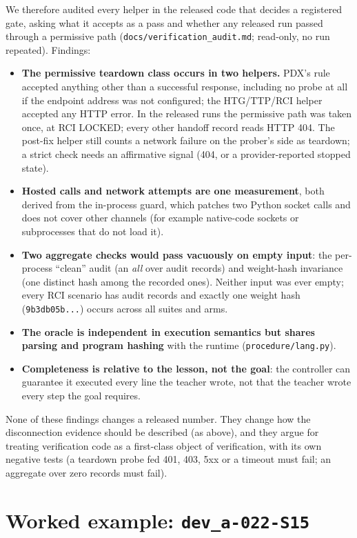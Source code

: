 \documentclass[10pt]{article}
\newcommand{\id}[1]{\nolinkurl{#1}}
\begin{document}
We therefore audited every helper in the released code that decides a registered gate, asking what it accepts as a pass and whether any released run passed through a permissive path (\id{docs/verification_audit.md}; read-only, no run repeated). Findings:
\begin{itemize}
\item \textbf{The permissive teardown class occurs in two helpers.} PDX's rule accepted anything other than a successful response, including no probe at all if the endpoint address was not configured; the HTG/TTP/RCI helper accepted any HTTP error. In the released runs the permissive path was taken once, at RCI LOCKED; every other handoff record reads HTTP 404. The post-fix helper still counts a network failure on the prober's side as teardown; a strict check needs an affirmative signal (404, or a provider-reported stopped state).
\item \textbf{Hosted calls and network attempts are one measurement}, both derived from the in-process guard, which patches two Python socket calls and does not cover other channels (for example native-code sockets or subprocesses that do not load it).
\item \textbf{Two aggregate checks would pass vacuously on empty input}: the per-process ``clean'' audit (an \emph{all} over audit records) and weight-hash invariance (one distinct hash among the recorded ones). Neither input was ever empty; every RCI scenario has audit records and exactly one weight hash (\id{9b3db05b...}) occurs across all suites and arms.
\item \textbf{The oracle is independent in execution semantics but shares parsing and program hashing} with the runtime (\id{procedure/lang.py}).
\item \textbf{Completeness is relative to the lesson, not the goal}: the controller can guarantee it executed every line the teacher wrote, not that the teacher wrote every step the goal requires.
\end{itemize}
None of these findings changes a released number. They change how the disconnection evidence should be described (as above), and they argue for treating verification code as a first-class object of verification, with its own negative tests (a teardown probe fed 401, 403, 5xx or a timeout must fail; an aggregate over zero records must fail).

\section{Worked example: \texorpdfstring{\id{dev_a-022-S15}}{dev\_a-022-S15}}\label{sec:example}
\end{document}
